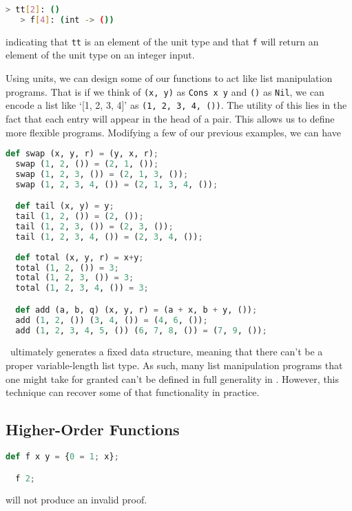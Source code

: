 \begin{lstlisting}[language=bash]
   > tt[2]: ()
   > f[4]: (int -> ())
\end{lstlisting}

indicating that \lstinline{tt} is an element of the unit type and that \lstinline{f} will return an element of the unit type on an integer input.

Using units, we can design some of our functions to act like list manipulation programs. That is if we think of \lstinline{(x, y)} as \lstinline{Cons x y} and \lstinline{()} as \lstinline{Nil}, we can encode a list like `[1, 2, 3, 4]' as \lstinline{(1, 2, 3, 4, ())}. The utility of this lies in the fact that each entry will appear in the head of a pair. This allows us to define more flexible programs. Modifying a few of our previous examples, we can have

\begin{lstlisting}[language=Python]
  def swap (x, y, r) = (y, x, r);
  swap (1, 2, ()) = (2, 1, ());
  swap (1, 2, 3, ()) = (2, 1, 3, ());
  swap (1, 2, 3, 4, ()) = (2, 1, 3, 4, ());

  def tail (x, y) = y;
  tail (1, 2, ()) = (2, ());
  tail (1, 2, 3, ()) = (2, 3, ());  
  tail (1, 2, 3, 4, ()) = (2, 3, 4, ());
  
  def total (x, y, r) = x+y;
  total (1, 2, ()) = 3;
  total (1, 2, 3, ()) = 3;  
  total (1, 2, 3, 4, ()) = 3;

  def add (a, b, q) (x, y, r) = (a + x, b + y, ());
  add (1, 2, ()) (3, 4, ()) = (4, 6, ());
  add (1, 2, 3, 4, 5, ()) (6, 7, 8, ()) = (7, 9, ());
\end{lstlisting}

\vampir\ ultimately generates a fixed data structure, meaning that there can't be a proper variable-length list type. As such, many list manipulation programs that one might take for granted can't be defined in full generality in \vampir. However, this technique can recover some of that functionality in practice.







\subsection{Higher-Order Functions} \label{HOF}

\begin{lstlisting}[language=Python]
  def f x y = {0 = 1; x};

  f 2;
\end{lstlisting}

will not produce an invalid proof.
